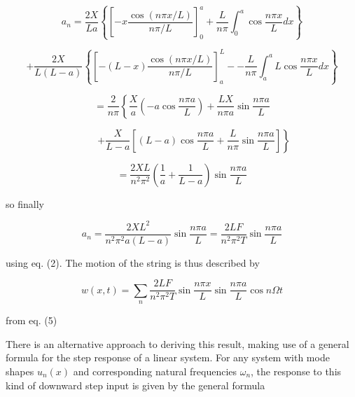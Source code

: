   \begin{equation*}a_n=\dfrac{2X}{La} \left\lbrace \left[ -x \dfrac{\cos (n \pi 
  x/L)}{n \pi/L} \right] _0^a + \dfrac{L}{n \pi} \int_0^a{\cos \dfrac{n \pi 
  x}{L} dx}\right\rbrace \end{equation*} 

  \begin{equation*}+\dfrac{2X}{L(L-a)} \left\lbrace \left[ -(L-x) \dfrac{\cos 
  (n \pi x/L)}{n \pi/L} \right]_a^L -- \dfrac{L}{n \pi} \int_a^aL{\cos \dfrac{n 
  \pi x}{L} dx}\right\rbrace \end{equation*} 

  \begin{equation*} = \dfrac{2}{n \pi}\left\lbrace \dfrac{X}{a}\left( -a \cos 
  \dfrac{n \pi a}{L}\right) +\dfrac{LX}{n \pi a}\sin \dfrac{n \pi a}{L} \right. 
  \end{equation*} 

  \begin{equation*}\mathrm{~~~~~~~~~~~}\left. +\dfrac{X}{L-a}\left[ (L-a) \cos 
  \dfrac{n \pi a}{L} +\dfrac{L}{n \pi}\sin \dfrac{n \pi a}{L}\right] 
  \right\rbrace \end{equation*} 

  \begin{equation*}= \dfrac{2XL}{n^2 \pi^2} \left( 
  \dfrac{1}{a}+\dfrac{1}{L-a}\right) \sin \dfrac{n \pi a}{L}\end{equation*} 

  \noindent{}so finally 

  \begin{equation*}a_n= \dfrac{2XL^2}{n^2 \pi^2 a(L-a)} \sin \dfrac{n \pi 
  a}{L}= \dfrac{2LF}{n^2 \pi^2 T} \sin \dfrac{n \pi a}{L} 
  \tag{11}\end{equation*} 

  \noindent{}using eq. (2). The motion of the string is thus described by 

  \begin{equation*}w(x,t)= \sum_n{\dfrac{2LF}{n^2 \pi^2 T} \sin \dfrac{n \pi 
  x}{L} \sin \dfrac{n \pi a}{L} \cos n \Omega t } \tag{12}\end{equation*} 

  \noindent{}from eq. (5) 

  There is an alternative approach to deriving this result, making use of a 
  general formula for the step response of a linear system. For any system with 
  mode shapes $u_n(x)$ and corresponding natural frequencies $\omega_n$, the 
  response to this kind of downward step input is given by the general formula 


